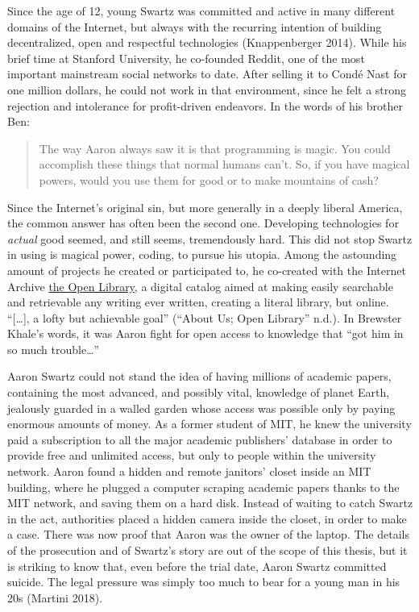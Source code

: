 \documentclass[
  a4paper,
]{book}
\begin{document}
Since the age of 12, young Swartz was committed and active in many different domains of the Internet, but always with the recurring intention of building decentralized, open and respectful technologies {(Knappenberger 2014)}. While his brief time at Stanford University, he co-founded Reddit, one of the most important mainstream social networks to date. After selling it to Condé Nast for one million dollars, he could not work in that environment, since he felt a strong rejection and intolerance for profit-driven endeavors. In the words of his brother Ben:

\begin{quote}
The way Aaron always saw it is that programming is magic. You could accomplish these things that normal humans can't. So, if you have magical powers, would you use them for good or to make mountains of cash?
\end{quote}

Since the Internet's original sin, but more generally in a deeply liberal America, the common answer has often been the second one. Developing technologies for \emph{actual} good seemed, and still seems, tremendously hard. This did not stop Swartz in using is magical power, coding, to pursue his utopia. Among the astounding amount of projects he created or participated to, he co-created with the Internet Archive \href{https://openlibrary.org}{the Open Library}, a digital catalog aimed at making easily searchable and retrievable any writing ever written, creating a literal library, but online. ``{[}\ldots{]}, a lofty but achievable goal'' {({``About {Us}; {Open Library}''} n.d.)}. In Brewster Khale's words, it was Aaron fight for open access to knowledge that ``got him in so much trouble\ldots{}''

Aaron Swartz could not stand the idea of having millions of academic papers, containing the most advanced, and possibly vital, knowledge of planet Earth, jealously guarded in a walled garden whose access was possible only by paying enormous amounts of money. As a former student of MIT, he knew the university paid a subscription to all the major academic publishers' database in order to provide free and unlimited access, but only to people within the university network. Aaron found a hidden and remote janitors' closet inside an MIT building, where he plugged a computer scraping academic papers thanks to the MIT network, and saving them on a hard disk. Instead of waiting to catch Swartz in the act, authorities placed a hidden camera inside the closet, in order to make a case. There was now proof that Aaron was the owner of the laptop. The details of the prosecution and of Swartz's story are out of the scope of this thesis, but it is striking to know that, even before the trial date, Aaron Swartz committed suicide. The legal pressure was simply too much to bear for a young man in his 20s {(Martini 2018)}.
\end{document}
